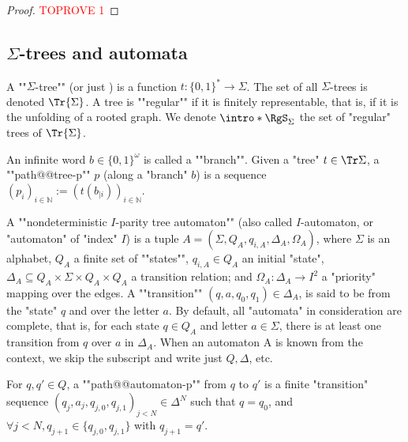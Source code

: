 \documentclass[a4paper,UKenglish,cleveref, autoref, thm-restate]{lipics-v2021}
\newcommand{\NN}{\mathbb{N}}
\begin{document}
\begin{proof}\textcolor{red}{TOPROVE 1}\end{proof}





\subsection{$\Sigma$-trees and automata}
\AP A ""$\Sigma$-tree"" (or just ) is a function $t : \{0,1\}^* \to \Sigma$. The set of all $\Sigma$-trees is denoted ${\Tr {\Sigma}}$. A tree is ""regular"" if it is finitely representable, that is, if it is the unfolding of a rooted graph. We denote $\intro*\RgS_\Sigma$ the set of "regular" trees of $\Tr{\Sigma}$.

\AP An infinite word $b \in \{0,1\}^\omega$ is called a ""branch"".
Given a  "tree" $t\in \Tr\Sigma$, a ""path@@tree-p"" $p$ (along a "branch" $b$) is a sequence $(p_i)_{i \in \NN} := (t(b_{|i}))_{i\in \NN}$.

\AP A ""nondeterministic $I$-parity tree automaton"" (also called $I$-automaton, or "automaton" of "index" $I$) is
a tuple $A = (\Sigma, Q_A , q_{i,A}, \Delta_A, \Omega_A )$, where $\Sigma$ is an alphabet, $Q_A$ a finite set of ""states"", $q_{i,A} \in Q_A$ an initial "state", $\Delta_A \subseteq Q_A \times \Sigma \times Q_A \times Q_A$ a transition relation; and $\Omega_A : \Delta_A \to I^2$ a "priority" mapping over the edges. 
A ""transition"" $(q, a, q_0 , q_1) \in \Delta_A$, is said to be from the "state" $q$ and over the letter $a$. By default, all "automata" in consideration are complete, that is, for each state $q \in Q_A$ and letter $a\in \Sigma$, there is at least one transition from $q$ over $a$ in $\Delta_A$.
When an automaton A is known from the context, we skip the subscript and write just $Q,\Delta$, etc.

\AP For $q,q' \in Q$, a ""path@@automaton-p"" from $q$ to $q'$ is  a finite "transition" sequence $(q_j, a_j, q_{j,0}, q_{j,1})_{j< N} \in \Delta^N$ such that $q = q_0$, and $\forall j < N, q_{j+1}\in \{q_{j,0}, q_{j,1}\}$ with $q_{j+1} = q'$.
\end{document}
